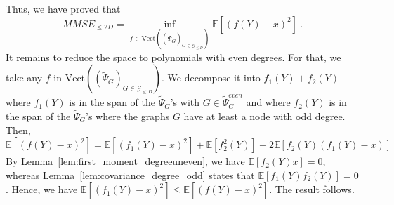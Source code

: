 \documentclass{article}
\begin{document}
Thus, we have proved that 
\[
MMSE_{\leq 2D}= \inf_{f\in \mathrm{Vect}((\widetilde{\Psi}_{G})_{G\in \mathcal{G}_{\leq D}})}\mathbb{E}[(f(Y)-x)^2]\ . 
\]
It remains to reduce the space to polynomials with even degrees. 
For that, we take any $f$ in $\mathrm{Vect}((\widetilde{\Psi}_{G})_{G\in \mathcal{G}_{\leq D}})$. We decompose it into $f_1(Y)+ f_2(Y)$ where $f_1(Y)$ is in the span of the $\widetilde{\Psi}_{G}$'s with $G\in \widetilde{\Psi}^{even}_{G}$ and where $f_2(Y)$ is in the span of the  $\widetilde{\Psi}_{G}$'s where the graphs $G$ have at least a node with odd degree. 
Then, 
\[
\mathbb{E}[(f(Y)-x)^2]= \mathbb{E}[(f_1(Y)-x)^2] + \mathbb{E}[f^2_2(Y)] + 2 \mathbb{E}[f_2(Y)(f_1(Y)-x)]
\]
By Lemma~\ref{lem:first_moment_degreeuneven}, we have $\mathbb{E}[f_2(Y)x]= 0$, whereas Lemma~\ref{lem:covariance_degree_odd} states that $\mathbb{E}[f_1(Y)f_2(Y)]= 0$. Hence, we have $ \mathbb{E}[(f_1(Y)-x)^2]\leq \mathbb{E}[(f(Y)-x)^2]$. The result follows. 
\end{document}
